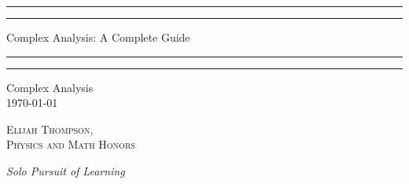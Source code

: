\documentclass[12pt, a4paper, oneside, openright, titlepage]{book}
\begin{document}

\begin{titlepage}
    \centering
    \scshape
    \vspace*{\baselineskip}
    \rule{\textwidth}{1.6pt}\vspace*{-\baselineskip}\vspace*{2pt}
    \rule{\textwidth}{0.4pt}
    
    \vspace{0.75\baselineskip}
    
    {\LARGE Complex Analysis: A Complete Guide}
    
    \vspace{0.75\baselineskip}
    
    \rule{\textwidth}{0.4pt}\vspace*{-\baselineskip}\vspace{3.2pt}
    \rule{\textwidth}{1.6pt}
    
    \vspace{2\baselineskip}
    Complex Analysis \\
    \vspace*{3\baselineskip}
    \monthdayyeardate\today \\
    \vspace*{5.0\baselineskip}
    
    {\scshape\Large Elijah Thompson, \\ Physics and Math Honors\\}
    
    \vspace{1.0\baselineskip}
    \textit{Solo Pursuit of Learning}
    \vfill
    \enlargethispage{1in}
    \begin{figure}[b!]
    \end{figure}
\end{titlepage}
\end{document}
